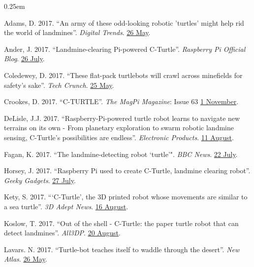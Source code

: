 \documentclass[12pt,a4paper]{article}
\begin{document}
		\begin{description}
			\itemsep0.25em
			\item Adams, D. 2017. ``An army of these odd-looking robotic 'turtles' might help rid the world of landmines''. \textit{Digital Trends}. \href{https://www.digitaltrends.com/cool-tech/robot-turtles-detect-landmines/}{26 May}.
			\item Ander, J. 2017. ``Landmine-clearing Pi-powered C-Turtle''. \textit{Raspberry Pi Official Blog}. \href{https://www.raspberrypi.org/blog/landmine-c-turtle/}{26 July}.
			\item Coledewey, D. 2017. ``These flat-pack turtlebots will crawl across minefields for safety's sake''. \textit{Tech Crunch}. \href{https://techcrunch.com/2017/05/25/these-flat-pack-turtlebots-will-crawl-across-minefields-for-safetys-sake/}{25 May}.
			\item Crookes, D. 2017. ``C-TURTLE''. \textit{The MagPi Magazine}: Issue 63 \href{https://www.raspberrypi.org/magpi/c-turtle/}{1 November}.
			\item DeLisle, J.J. 2017. ``Raspberry-Pi-powered turtle robot learns to navigate new terrains on its own - From planetary exploration to swarm robotic landmine sensing, C-Turtle's possibilities are endless''. \textit{Electronic Products}. \href{https://www.electronicproducts.com/Robotics/AI/Raspberry_Pi_powered_turtle_robot_learns_to_navigate_new_terrains_on_its_own.aspx}{11 August}.
			\item Fagan, K. 2017. ``The landmine-detecting robot `turtle'". \textit{BBC News}. \href{http://www.bbc.com/news/av/technology-40296297/the-soft-3d-printed-robot-that-could-come-to-the-rescue}{22 July}.
			\item Horsey, J. 2017. ``Raspberry Pi used to create C-Turtle, landmine clearing robot''. \textit{Geeky Gadgets}. \href{https://www.geeky-gadgets.com/landmine-clearing-robot-27-07-2017/}{27 July}.
			\item Kety, S. 2017. ```C-Turtle', the 3D printed robot whose movements are similar to a sea turtle''. \textit{3D Adept News}. \href{https://3dadept.com/c-turtle-the-3d-printed-robot-whose-movements-are-similar-to-a-sea-turtle/}{16 August}.
			\item Koslow, T. 2017. ``Out of the shell - C-Turtle: the paper turtle robot that can detect landmines''. \textit{All3DP}. \href{https://all3dp.com/landmine-detecting-robot-c-turtle/}{20 August}.
			\item Lavars. N. 2017. ``Turtle-bot teaches itself to waddle through the desert''. \textit{New Atlas}. \href{https://newatlas.com/turtle-robot-self-learning-waddle/49738/}{26 May}.

\end{description}
\end{document}
